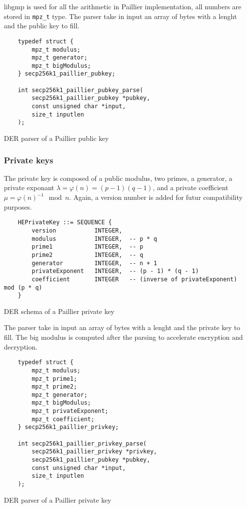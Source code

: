 libgmp is used for all the arithmetic in Paillier implementation, all numbers are
stored in \texttt{mpz\_t} type. The parser take in input an array of bytes with a
lenght and the public key to fill.

\begin{listing}
  \begin{verbatim}
    typedef struct {
        mpz_t modulus;
        mpz_t generator;
        mpz_t bigModulus;
    } secp256k1_paillier_pubkey;

    int secp256k1_paillier_pubkey_parse(
        secp256k1_paillier_pubkey *pubkey,
        const unsigned char *input,
        size_t inputlen
    );
  \end{verbatim}
	\caption{DER parser of a Paillier public key}
	\label{lst:DERImplPaillierParsePub}
\end{listing}


\subsubsection{Private keys}

The private key is composed of a public modulus, two primes, a generator, a
private exponant $\lambda = \varphi(n) = (p-1)(q-1)$, and a private coefficient
$\mu = \varphi(n)^{-1} \mod n$. Again, a version number is added for futur
compatibility purposes.

\begin{listing}
  \begin{verbatim}
    HEPrivateKey ::= SEQUENCE {
        version           INTEGER,
        modulus           INTEGER,  -- p * q
        prime1            INTEGER,  -- p
        prime2            INTEGER,  -- q
        generator         INTEGER,  -- n + 1
        privateExponent   INTEGER,  -- (p - 1) * (q - 1)
        coefficient       INTEGER   -- (inverse of privateExponent) mod (p * q)
    }
  \end{verbatim}
	\caption{DER schema of a Paillier private key}
	\label{lst:DERSchemaPaillierPriv}
\end{listing}

The parser take in input an array of bytes with a lenght and the private key to fill.
The big modulus is computed after the parsing to accelerate encryption and decryption.

\begin{listing}
  \begin{verbatim}
    typedef struct {
        mpz_t modulus;
        mpz_t prime1;
        mpz_t prime2;
        mpz_t generator;
        mpz_t bigModulus;
        mpz_t privateExponent;
        mpz_t coefficient;
    } secp256k1_paillier_privkey;

    int secp256k1_paillier_privkey_parse(
        secp256k1_paillier_privkey *privkey,
        secp256k1_paillier_pubkey *pubkey,
        const unsigned char *input,
        size_t inputlen
    );
  \end{verbatim}
	\caption{DER parser of a Paillier private key}
	\label{lst:DERImplPaillierParsePriv}
\end{listing}

